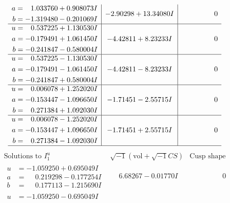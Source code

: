 \documentclass[1p]{elsarticle_modified}
\theoremstyle{definition}
\newcommand{\I}{\sqrt{-1}}
\begin{document}
$$\begin{array}{c|c|c}
\begin{aligned}
a &= \phantom{-}1.033760 + 0.908073 I \\
b &= -1.319480 - 0.201069 I\end{aligned}
 & -2.90298 + 13.34080 I & \phantom{-0.000000 } 0 \\ \hline\begin{aligned}
u &= \phantom{-}0.537225 + 1.130530 I \\
a &= -0.179491 + 1.061450 I \\
b &= -0.241847 - 0.580004 I\end{aligned}
 & -4.42811 + 8.23233 I & \phantom{-0.000000 } 0 \\ \hline\begin{aligned}
u &= \phantom{-}0.537225 - 1.130530 I \\
a &= -0.179491 - 1.061450 I \\
b &= -0.241847 + 0.580004 I\end{aligned}
 & -4.42811 - 8.23233 I & \phantom{-0.000000 } 0 \\ \hline\begin{aligned}
u &= \phantom{-}0.006078 + 1.252020 I \\
a &= -0.153447 - 1.096650 I \\
b &= \phantom{-}0.271384 + 1.092030 I\end{aligned}
 & -1.71451 - 2.55715 I & \phantom{-0.000000 } 0 \\ \hline\begin{aligned}
u &= \phantom{-}0.006078 - 1.252020 I \\
a &= -0.153447 + 1.096650 I \\
b &= \phantom{-}0.271384 - 1.092030 I\end{aligned}
 & -1.71451 + 2.55715 I & \phantom{-0.000000 } 0\\
 \hline 
 \end{array}$$\newpage$$\begin{array}{c|c|c}  
\text{Solutions to }I^u_{1}& \I (\text{vol} + \sqrt{-1}CS) & \text{Cusp shape}\\
 \hline 
\begin{aligned}
u &= -1.059250 + 0.695049 I \\
a &= \phantom{-}0.219298 - 0.177254 I \\
b &= \phantom{-}0.177113 - 1.215690 I\end{aligned}
 & \phantom{-}6.68267 - 0.01770 I & \phantom{-0.000000 } 0 \\ \hline\begin{aligned}
u &= -1.059250 - 0.695049 I \\

\end{aligned}
\end{array}$$
\end{document}
